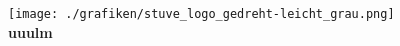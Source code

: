 
\thispagestyle{empty}
\null\vfill
\begin{center}
	{\normalsize {}}
\end{center}
\vfill\null\vfill
\clearpage
\thispagestyle{empty}
\null
\vspace{16.5cm}
\begin{center}
	\texttt{[image: ./grafiken/stuve\_logo\_gedreht-leicht\_grau.png]}\\
	\textcolor{black!40}{\large \textbf{uuulm}}
\end{center}
